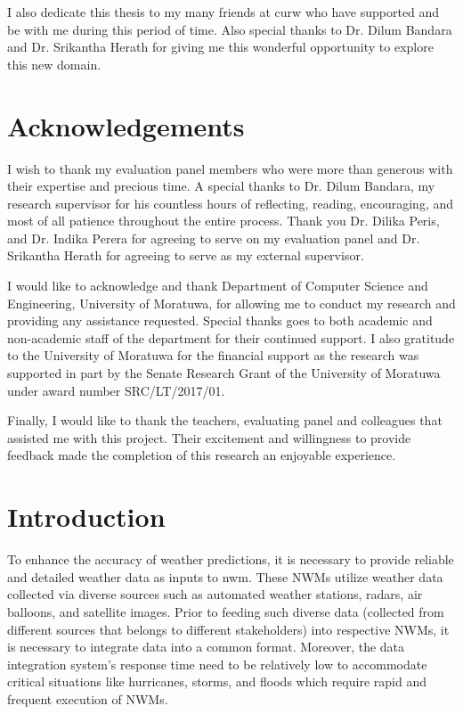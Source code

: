 \documentclass[a4paper,oneside,12pt]{report}
\begin{document}
I also dedicate this thesis to my many friends at \acrshort{curw} who have supported and be with me during this period of time. Also special thanks to Dr. Dilum Bandara and Dr. Srikantha Herath for giving me this wonderful opportunity to explore this new domain.

\chapter*{Acknowledgements}
I wish to thank my evaluation panel members who were more than generous with their expertise and precious time. A special thanks to Dr. Dilum Bandara, my research supervisor for his countless hours of reflecting, reading, encouraging, and most of all patience throughout the entire process. Thank you Dr. Dilika Peris, and Dr. Indika Perera for agreeing to serve on my evaluation panel and Dr. Srikantha Herath for agreeing to serve as my external supervisor.

I would like to acknowledge and thank Department of Computer Science and Engineering, University of Moratuwa, for allowing me to conduct my research and providing any assistance requested. Special thanks goes to both academic and non-academic staff of the department for their continued support. I also gratitude to the University of Moratuwa for the financial support as the research was supported in part by the Senate Research Grant of the University of Moratuwa under award number SRC/LT/2017/01.

Finally, I would like to thank the teachers, evaluating panel and colleagues that assisted me with this project. Their excitement and willingness to provide feedback made the completion of this research an enjoyable experience.

\tableofcontents

\listoffigures

\listoftables

\printglossary[type=\acronymtype, title=List of Abbreviations, toctitle=List of Abbreviations, nonumberlist]


\chapter{Introduction}
\label{ch:intro}
To enhance the accuracy of weather predictions, it is necessary to provide reliable and detailed weather data as inputs to \acrfull{nwm}. These NWMs utilize weather data collected via diverse sources such as automated weather stations, radars, air balloons, and satellite images. Prior to feeding such diverse data (collected from different sources that belongs to different stakeholders) into respective NWMs, it is necessary to integrate data into a common format. Moreover, the data integration system’s response time need to be relatively low to accommodate critical situations like hurricanes, storms, and floods which require rapid and frequent execution of NWMs.
\end{document}
